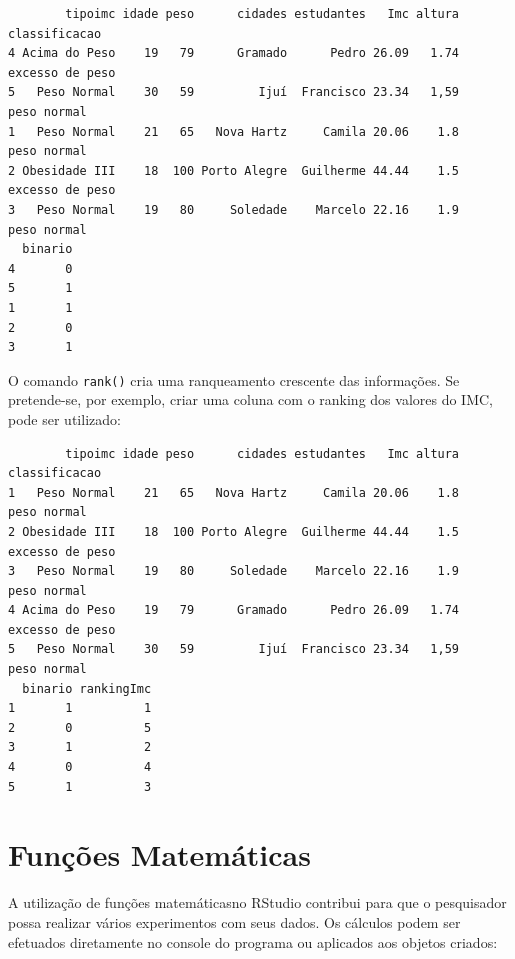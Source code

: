 \documentclass[12pt,brazil,oneside]{book}
\newenvironment{Shaded}{\begin{snugshade}}{\end{snugshade}}
\newcommand{\KeywordTok}[1]{\textcolor[rgb]{0.13,0.29,0.53}{\textbf{#1}}}
\newcommand{\NormalTok}[1]{#1}
\newcommand{\OperatorTok}[1]{\textcolor[rgb]{0.81,0.36,0.00}{\textbf{#1}}}
\begin{document}
\begin{verbatim}
        tipoimc idade peso      cidades estudantes   Imc altura   classificacao
4 Acima do Peso    19   79      Gramado      Pedro 26.09   1.74 excesso de peso
5   Peso Normal    30   59         Ijuí  Francisco 23.34   1,59     peso normal
1   Peso Normal    21   65   Nova Hartz     Camila 20.06    1.8     peso normal
2 Obesidade III    18  100 Porto Alegre  Guilherme 44.44    1.5 excesso de peso
3   Peso Normal    19   80     Soledade    Marcelo 22.16    1.9     peso normal
  binario
4       0
5       1
1       1
2       0
3       1
\end{verbatim}

O comando \texttt{rank()} cria uma ranqueamento crescente das
informações. Se pretende-se, por exemplo, criar uma coluna com o ranking
dos valores do IMC, pode ser utilizado:

\begin{Shaded}
\end{Shaded}

\begin{verbatim}
        tipoimc idade peso      cidades estudantes   Imc altura   classificacao
1   Peso Normal    21   65   Nova Hartz     Camila 20.06    1.8     peso normal
2 Obesidade III    18  100 Porto Alegre  Guilherme 44.44    1.5 excesso de peso
3   Peso Normal    19   80     Soledade    Marcelo 22.16    1.9     peso normal
4 Acima do Peso    19   79      Gramado      Pedro 26.09   1.74 excesso de peso
5   Peso Normal    30   59         Ijuí  Francisco 23.34   1,59     peso normal
  binario rankingImc
1       1          1
2       0          5
3       1          2
4       0          4
5       1          3
\end{verbatim}

\hypertarget{funcoes-matematicas}{%
\section{Funções Matemáticas}\label{funcoes-matematicas}}

A utilização de funções matemáticasno RStudio contribui para que o
pesquisador possa realizar vários experimentos com seus dados. Os
cálculos podem ser efetuados diretamente no console do programa ou
aplicados aos objetos criados:
\end{document}
